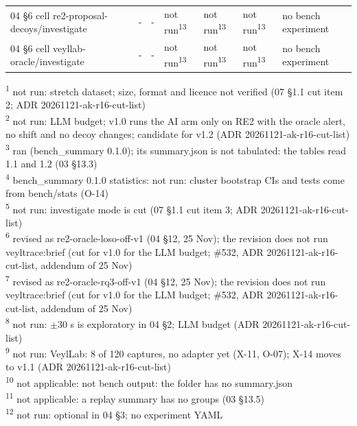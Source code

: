 \begin{table}[t]
\begin{tabular}{lllllll}
04 \S{}6 cell re2-proposal-decoys/investigate & - & - & not run\textsuperscript{13} & not run\textsuperscript{13} & not run\textsuperscript{13} & no bench experiment \\
04 \S{}6 cell veyllab-oracle/investigate & - & - & not run\textsuperscript{13} & not run\textsuperscript{13} & not run\textsuperscript{13} & no bench experiment \\
\hline
\end{tabular}
\par\smallskip\footnotesize
\textsuperscript{1} not run: stretch dataset; size, format and licence not verified (07 \S{}1.1 cut item 2; ADR 20261121-ak-r16-cut-list)\\
\textsuperscript{2} not run: LLM budget; v1.0 runs the AI arm only on RE2 with the oracle alert, no shift and no decoy changes; candidate for v1.2 (ADR 20261121-ak-r16-cut-list)\\
\textsuperscript{3} ran (bench\_summary 0.1.0); its summary.json is not tabulated: the tables read 1.1 and 1.2 (03 \S{}13.3)\\
\textsuperscript{4} bench\_summary 0.1.0 statistics: not run: cluster bootstrap CIs and tests come from bench/stats (O-14)\\
\textsuperscript{5} not run: investigate mode is cut (07 \S{}1.1 cut item 3; ADR 20261121-ak-r16-cut-list)\\
\textsuperscript{6} revised as re2-oracle-loso-off-v1 (04 \S{}12, 25 Nov); the revision does not run veyltrace:brief (cut for v1.0 for the LLM budget; \#532, ADR 20261121-ak-r16-cut-list, addendum of 25 Nov)\\
\textsuperscript{7} revised as re2-oracle-rq3-off-v1 (04 \S{}12, 25 Nov); the revision does not run veyltrace:brief (cut for v1.0 for the LLM budget; \#532, ADR 20261121-ak-r16-cut-list, addendum of 25 Nov)\\
\textsuperscript{8} not run: $\pm$30 s is exploratory in 04 \S{}2; LLM budget (ADR 20261121-ak-r16-cut-list)\\
\textsuperscript{9} not run: VeylLab: 8 of 120 captures, no adapter yet (X-11, O-07); X-14 moves to v1.1 (ADR 20261121-ak-r16-cut-list)\\
\textsuperscript{10} not applicable: not bench output: the folder has no summary.json\\
\textsuperscript{11} not applicable: a replay summary has no groups (03 \S{}13.5)\\
\textsuperscript{12} not run: optional in 04 \S{}3; no experiment YAML\\

\end{table}
